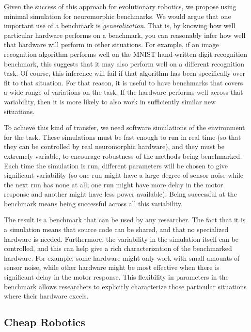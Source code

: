 \documentclass{frontiersSCNS} %
\begin{document}
Given the success of this approach for evolutionary robotics, we propose
using minimal simulation for neuromorphic benchmarks.  We would argue that
one important use of a benchmark is \emph{generalization}.  That is, by knowing how well particular
hardware performs on a benchmark, you can reasonably infer how well
that hardware will perform in other situations.  For example, if an image recognition
algorithm performs well on the MNIST hand-written digit recognition
benchmark, this suggests that it may also perform well on
a different recognition task.  Of course, this inference will fail if that
algorithm has been specifically over-fit to that situation.  For
that reason, it is useful to have benchmarks that covers a wide range
of variations on the task.  If the hardware performs well across that
variability, then it is more likely to also work in sufficiently similar new situations.

To achieve this kind of transfer, we need software simulations of the environment for the task.
These simulations
must be fast enough to run in real time (so that they can be controlled by
real neuromorphic hardware), and they must be extremely variable, to encourage
robustness of the methods being benchmarked.  Each time
the simulation is run, different parameters will be chosen to give significant variability
(so one run might have a large degree of sensor noise while the next run has
none at all; one run might have more delay in the motor response and another
might have less power available).  Being successful at the benchmark means
being successful across all this variability.  

The result is a benchmark that can be used by any researcher.  The fact
that it is a simulation means that source code can be shared, and that no
specialized hardware is needed.  Furthermore, the variability in the simulation
itself can be controlled, and this can help give a rich characterization of
the benchmarked hardware.  For example, some hardware might only work with
small amounts of sensor noise, while other hardware might be most effective when there
is significant delay in the motor response.  This flexibility in parameters
in the benchmark allows researchers to explicitly characterize those particular
situations where their hardware excels.  

\subsection{Cheap Robotics}
\end{document}
